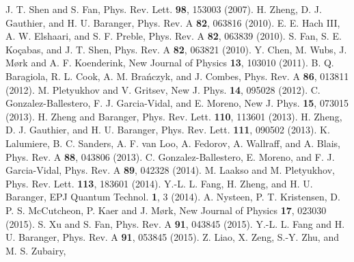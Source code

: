 \documentclass[aps,pra,twocolumn,floatfix,superscriptaddress]{revtex4}
\begin{document}
\begin{thebibliography}{5}
 J. T. Shen and S. Fan, Phys. Rev. Lett. {\bf 98}, 153003 (2007).
 H. Zheng, D. J. Gauthier, and H. U. Baranger, Phys. Rev. A {\bf 82}, 063816 (2010).
 E. E. Hach III, A. W. Elshaari, and S. F. Preble, Phys. Rev. A {\bf 82}, 063839 (2010).
 S. Fan, S. E. Ko\c cabas, and J. T. Shen, Phys. Rev. A {\bf 82}, 063821 (2010).
 Y. Chen, M. Wubs, J. M\o rk and A. F. Koenderink, New Journal of Physics {\bf 13}, 103010 (2011).
 B. Q. Baragiola, R. L. Cook, A. M. Bra\' nczyk, and J. Combes, Phys. Rev. A {\bf 86}, 013811 (2012).
 M. Pletyukhov and V. Gritsev, 
New J. Phys. {\bf 14}, 095028 (2012).
 C. Gonzalez-Ballestero, F. J. Garcia-Vidal, and E. Moreno, 
New J. Phys. {\bf 15}, 073015 (2013).
 H. Zheng and Baranger, 
Phys. Rev. Lett. {\bf 110}, 113601 (2013).
 H. Zheng, D. J. Gauthier, and H. U. Baranger,
Phys. Rev. Lett. {\bf 111}, 090502 (2013).
 K. Lalumiere, B. C. Sanders, A. F. van Loo, A. Fedorov, A. Wallraff, and A. Blais,
 Phys. Rev. A {\bf 88}, 043806 (2013).
 C. Gonzalez-Ballestero, E. Moreno, and F. J. Garcia-Vidal, Phys. Rev. A {\bf 89}, 042328 (2014).
 M. Laakso and M. Pletyukhov,
Phys. Rev. Lett. {\bf 113}, 183601 (2014).
 Y.-L. L. Fang, H. Zheng, and H. U. Baranger,
 EPJ Quantum Technol. {\bf 1}, 3 (2014).
 A. Nysteen, P. T. Kristensen, D. P. S. McCutcheon, P. Kaer and J. M\o rk, New Journal of Physics {\bf 17}, 023030 (2015).
 S. Xu and S. Fan, 
Phys. Rev. A {\bf 91}, 043845 (2015).
 Y.-L. L. Fang and H. U. Baranger,
 Phys. Rev. A {\bf 91}, 053845 (2015).
 Z. Liao, X. Zeng, S.-Y. Zhu, and M. S. Zubairy,

\end{thebibliography}
\end{document}
